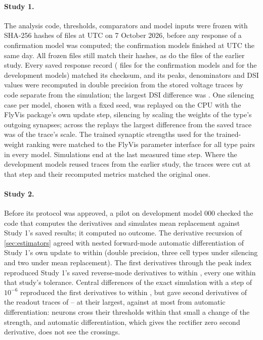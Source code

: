 \paragraph{Study 1.} The analysis code, thresholds, comparators and model inputs were frozen with SHA-256 hashes of \FrozenFiles{} files at \FreezeTime{} UTC on 7 October 2026, before any response of a confirmation model was computed; the confirmation models finished at \ConfirmationDoneTime{} UTC the same day. All frozen files still match their hashes, as do the \OriginalFiles{} files of the earlier study. Every saved response record (\CheckedFilesConf{} files for the confirmation models and \CheckedFilesDev{} for the development models) matched its checksum, and its peaks, denominators and DSI values were recomputed in double precision from the stored voltage traces by code separate from the simulation; the largest DSI difference was \DsiRecomputeMaxErr{}. One silencing case per model, chosen with a fixed seed, was replayed on the CPU with the FlyVis package's own update step, silencing by scaling the weights of the type's outgoing synapses; across the \ReplayCount{} replays the largest difference from the saved trace was \ReplayMaxErr{} of the trace's scale. The trained synaptic strengths used for the trained-weight ranking were matched to the FlyVis parameter interface for all \IndexedTypePairs{} type pairs in every model. Simulations end at the last measured time step. Where the development models reused traces from the earlier study, the traces were cut at that step and their recomputed metrics matched the original ones.

\paragraph{Study 2.}
\label{app:checks}
Before its protocol was approved, a pilot on development model 000 checked the code that computes the derivatives and simulates mean replacement against Study 1's saved results; it computed no outcome. The derivative recursion of \cref{sec:estimators} agreed with nested forward-mode automatic differentiation of Study 1's own update to within \PilotAutodiffMax{} (double precision, three cell types under silencing and two under mean replacement). The first derivatives through the peak index reproduced Study 1's saved reverse-mode derivatives to within \PilotGradMax{}, every one within that study's tolerance. Central differences of the exact simulation with a step of $10^{-6}$ reproduced the first derivatives to within \PilotFDJMax{}, but gave second derivatives of the readout traces of \PilotFDKMin{}--\PilotFDKMax{} at their largest, against at most \PilotAutoKMax{} from automatic differentiation: neurons cross their thresholds within that small a change of the strength, and automatic differentiation, which gives the rectifier zero second derivative, does not see the crossings.

